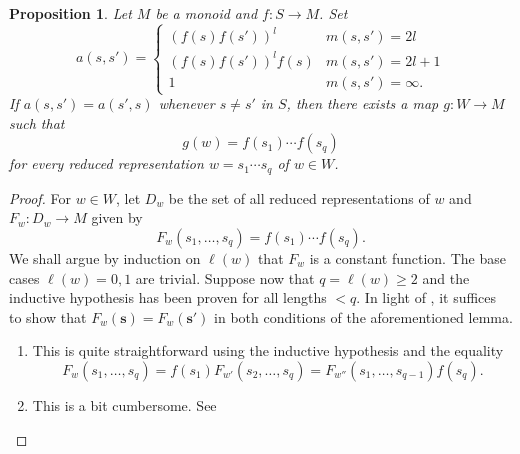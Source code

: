 \documentclass{article}
\theoremstyle{thmstyle}
\newtheorem{proposition}[theorem]{Proposition}
\theoremstyle{defstyle}
\renewcommand{\ge}{\geqslant}
\begin{document}
\begin{proposition}
    Let $M$ be a monoid and $f: S\to M$. Set 
    \begin{equation*}
        a(s, s') = 
        \begin{cases}
            \left(f(s)f(s')\right)^l & m(s, s') = 2l\\
            \left(f(s)f(s')\right)^l f(s) & m(s, s') = 2l + 1\\
            1 & m(s, s') = \infty.
        \end{cases}
    \end{equation*}
    If $a(s, s') = a(s' ,s)$ whenever $s\ne s'$ in $S$, then there exists a map $g: W\to M$ such that 
    \begin{equation*}
        g(w) = f(s_1)\cdots f(s_q)
    \end{equation*}
    for every reduced representation $w = s_1\cdots s_q$ of $w\in W$.
\end{proposition}
\begin{proof}
    For $w\in W$, let $D_w$ be the set of all reduced representations of $w$ and $F_w: D_w\to M$ given by 
    \begin{equation*}
        F_w(s_1,\dots,s_q) = f(s_1)\cdots f(s_q).
    \end{equation*}
    We shall argue by induction on $\ell(w)$ that $F_w$ is a constant function. The base cases $\ell(w) = 0, 1$ are trivial. Suppose now that $q = \ell(w)\ge 2$ and the inductive hypothesis has been proven for all lengths $< q$. In light of , it suffices to show that $F_w(\mathbf s) = F_w(\mathbf s')$ in both conditions of the aforementioned lemma. 
    \begin{enumerate}[label=(\roman*)]
        \item This is quite straightforward using the inductive hypothesis and the equality
        \begin{equation*}
            F_w(s_1,\dots,s_q) = f(s_1)F_{w'}(s_2,\dots,s_q) = F_{w''}(s_1,\dots,s_{q - 1})f(s_q).
        \end{equation*}
        \item This is a bit cumbersome. See \cite[pg. 9]{bourbaki-lie-4-6}\qedhere
    \end{enumerate}
\end{proof}
\end{document}
